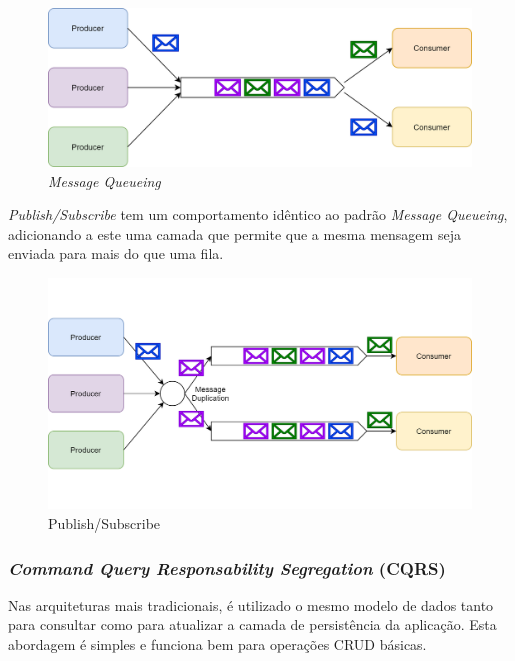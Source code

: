 \begin{figure}[H]
    \begin{center}
    \includegraphics[width=1\textwidth]{figures/message_queueing.png}
    \caption{\emph{Message Queueing}}
    \end{center}
\end{figure}

\emph{Publish/Subscribe} \label{publish_subscribe} tem um comportamento idêntico ao padrão \emph{Message Queueing}, adicionando a este uma camada que permite que a mesma mensagem seja enviada para mais do que uma fila.

\begin{figure}[H]
    \begin{center}
    \includegraphics[width=1\textwidth]{figures/pub_sub.png}
    \caption{Publish/Subscribe}
    \end{center}
\end{figure}

\subsubsection*{\emph{Command Query Responsability Segregation} (CQRS)} \label{cqrs}
Nas arquiteturas mais tradicionais, é utilizado o mesmo modelo de dados tanto para consultar como para atualizar a camada de persistência da aplicação. Esta abordagem é simples e funciona bem para operações CRUD básicas.

